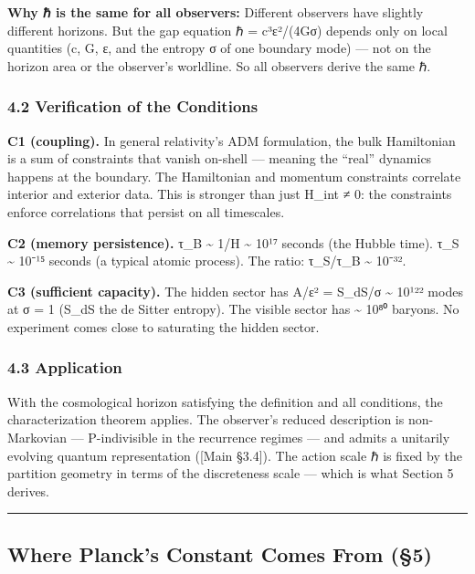 \documentclass[
]{article}
\begin{document}
\textbf{Why ℏ is the same for all observers:} Different observers have
slightly different horizons. But the gap equation ℏ = c³ε²/(4Gσ) depends
only on local quantities (c, G, ε, and the entropy σ of one boundary
mode) --- not on the horizon area or the observer's worldline. So all
observers derive the same ℏ.

\hypertarget{verification-of-the-conditions}{%
\subsubsection{4.2 Verification of the
Conditions}\label{verification-of-the-conditions}}

\textbf{C1 (coupling).} In general relativity's ADM formulation, the
bulk Hamiltonian is a sum of constraints that vanish on-shell ---
meaning the ``real'' dynamics happens at the boundary. The Hamiltonian
and momentum constraints correlate interior and exterior data. This is
stronger than just H\_int ≠ 0: the constraints enforce correlations that
persist on all timescales.

\textbf{C2 (memory persistence).} τ\_B \textasciitilde{} 1/H
\textasciitilde{} 10¹⁷ seconds (the Hubble time). τ\_S \textasciitilde{}
10⁻¹⁵ seconds (a typical atomic process). The ratio: τ\_S/τ\_B
\textasciitilde{} 10⁻³².

\textbf{C3 (sufficient capacity).} The hidden sector has A/ε² = S\_dS/σ
\textasciitilde{} 10¹²² modes at σ = 1 (S\_dS the de Sitter entropy).
The visible sector has \textasciitilde{} 10⁸⁰ baryons. No experiment
comes close to saturating the hidden sector.

\hypertarget{application}{%
\subsubsection{4.3 Application}\label{application}}

With the cosmological horizon satisfying the definition and all
conditions, the characterization theorem applies. The observer's reduced
description is non-Markovian --- P-indivisible in the recurrence regimes
--- and admits a unitarily evolving quantum representation ({[}Main
§3.4{]}). The action scale ℏ is fixed by the partition geometry in terms
of the discreteness scale --- which is what Section 5 derives.

\begin{center}\rule{0.5\linewidth}{0.5pt}\end{center}

\hypertarget{where-plancks-constant-comes-from-5}{%
\subsection{Where Planck's Constant Comes From
(§5)}\label{where-plancks-constant-comes-from-5}}
\end{document}
